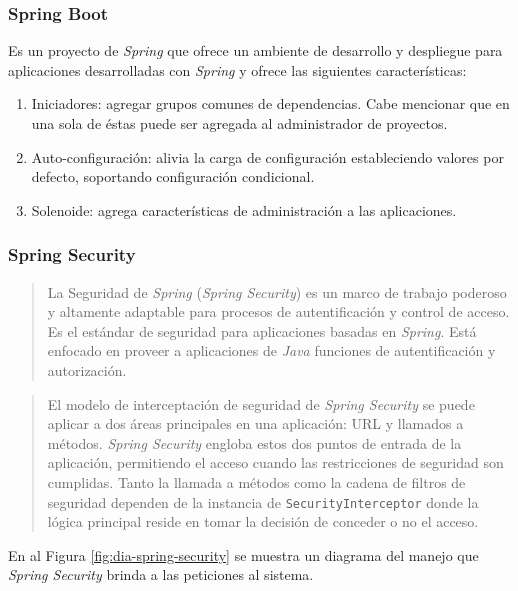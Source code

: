 \subsubsection{Spring Boot}\label{sec:spring-boot}
Es un proyecto de \textit{Spring} que ofrece un ambiente de desarrollo y despliegue para aplicaciones desarrolladas con \textit{Spring} y ofrece las siguientes características\cite{SpringBootInAction}:
\begin{enumerate}
	\item Iniciadores: agregar grupos comunes de dependencias. Cabe mencionar que en una sola de éstas puede ser agregada al administrador de proyectos.
	\item Auto-configuración: alivia la carga de configuración estableciendo valores por defecto, soportando configuración condicional.
	\item Solenoide: agrega características de administración a las aplicaciones.
\end{enumerate}

\subsubsection{Spring Security}\label{sec:spring-security}
\begin{quote}
	La Seguridad de \textit{Spring} (\textit{Spring Security}) es un marco de trabajo poderoso y altamente adaptable para procesos de autentificación y control de acceso. Es el estándar de seguridad para aplicaciones basadas en \textit{Spring}. Está enfocado en proveer a aplicaciones de \textit{Java} funciones de autentificación y autorización\cite{SpringSecurity}.
\end{quote}

\begin{quote}
	El modelo de interceptación de seguridad de \textit{Spring Security} se puede aplicar a dos áreas principales en una aplicación: URL y llamados a métodos. \textit{Spring Security} engloba estos dos puntos de entrada de la aplicación, permitiendo el acceso cuando las restricciones de seguridad son cumplidas. Tanto la llamada a métodos como la cadena de filtros de seguridad dependen de la instancia de \texttt{SecurityInterceptor} donde la lógica principal reside en tomar la decisión de conceder o no el acceso\cite{ProSpringSecurity}.
\end{quote}
En al Figura \ref{fig:dia-spring-security} se muestra un diagrama del manejo que \textit{Spring Security} brinda a las peticiones al sistema.

